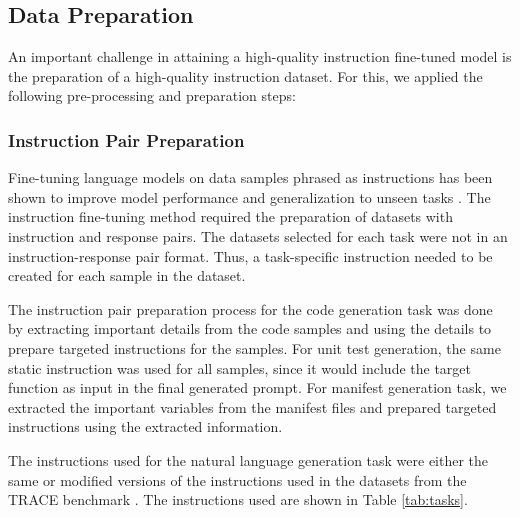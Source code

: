 \subsection{Data Preparation} \label{data_preparation}
An important challenge in attaining a high-quality instruction fine-tuned model is the preparation of a high-quality instruction dataset. For this, we applied the following pre-processing and preparation steps:

\subsubsection{Instruction Pair Preparation}
Fine-tuning language models on data samples phrased as instructions has been shown to improve model performance and generalization to unseen tasks \cite{chung2024scaling}. The instruction fine-tuning method required the preparation of datasets with instruction and response pairs. The datasets selected for each task were not in an instruction-response pair format. Thus, a task-specific instruction needed to be created for each sample in the dataset.

The instruction pair preparation process for the code generation task was done by extracting important details from the code samples and using the details to prepare targeted instructions for the samples. For unit test generation, the same static instruction was used for all samples, since it would include the target function as input in the final generated prompt. For manifest generation task, we extracted the important variables from the manifest files and prepared targeted instructions using the extracted information.

The instructions used for the natural language generation task were either the same or modified versions of the instructions used in the datasets from the TRACE benchmark \cite{wang2023trace}. The instructions used are shown in Table \ref{tab:tasks}.

